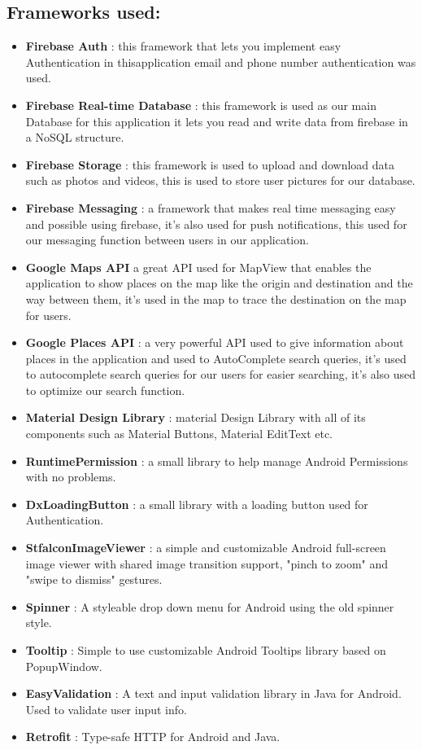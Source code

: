 \subsection{Frameworks used:}
\begin{itemize}
\item \textbf{Firebase Auth }: this framework that lets you implement easy Authentication in thisapplication email and phone number authentication was used.
\item \textbf{Firebase Real-time Database }: this framework is used as our main Database for 
this application it lets you read and write data from firebase in a NoSQL structure. 
\item \textbf{Firebase Storage }: this framework is used to upload and download data such as 
photos and videos, this is used to store user pictures for our database.
\item \textbf{Firebase Messaging }: a framework that makes real time messaging easy and possible using firebase, it’s also used for push notifications, this used for our messaging function between users in our application. 
\item \textbf{ Google Maps API }a great API used for MapView that enables the application to show places on the map like the origin and destination and the way between them, it’s used in the map to trace the destination on the map for users.
\item \textbf{Google Places API }: a very powerful API used to give information about places in the application and used to AutoComplete search queries, it’s used to autocomplete search queries for our users for easier searching, it’s also used to optimize our search function.
\item \textbf{Material Design Library }: material Design Library with all of its components such as Material Buttons, Material EditText etc.
\item \textbf{RuntimePermission }: a small library to help manage Android Permissions with no problems. 
\item \textbf{DxLoadingButton }: a small library with a loading button used for Authentication. 
\item \textbf{StfalconImageViewer }: a simple and customizable Android full-screen image viewer with shared image transition support, "pinch to zoom" and "swipe to dismiss" gestures.
\item \textbf{Spinner }: A styleable drop down menu for Android using the old spinner style. 
\item \textbf{Tooltip }: Simple to use customizable Android Tooltips library based on PopupWindow. 
\item \textbf{EasyValidation }: A text and input validation library in Java for Android. Used to validate user input info.
\item \textbf{Retrofit }: Type-safe HTTP for Android and Java.
\end{itemize}

